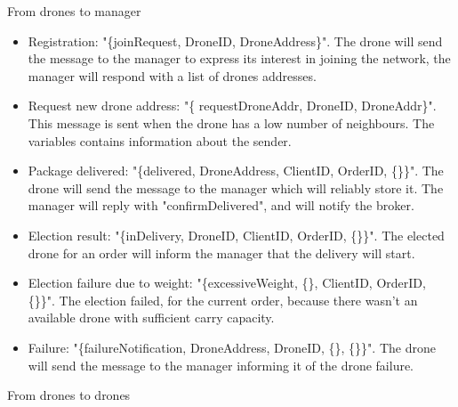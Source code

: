 \documentclass[a4paper, oneside]{memoir}
\begin{document}
From drones to manager
\begin{itemize}
	\item Registration: "\{joinRequest, DroneID, DroneAddress\}".
	The drone will send the message to the manager to express its interest in joining the network, the manager will respond with a list of drones addresses.

	\item Request new drone address: "\{ requestDroneAddr, DroneID, DroneAddr\}".
	This message is sent when the drone has a low number of neighbours. The variables contains information about the sender.

	\item Package delivered: "\{delivered, DroneAddress, ClientID, OrderID, \{\}\}".
	The drone will send the message to the manager which will reliably store it. The manager will reply with "confirmDelivered", and will notify the broker.

	\item Election result: "\{inDelivery, DroneID, ClientID, OrderID, \{\}\}".
	The elected drone for an order will inform the manager that the delivery will start.

	\item Election failure due to weight: "\{excessiveWeight, \{\}, ClientID, OrderID, \{\}\}".
	The election failed, for the current order, because there wasn't an available drone with sufficient carry capacity.

	\item Failure: "\{failureNotification, DroneAddress, DroneID, \{\}, \{\}\}".
	The drone will send the message to the manager informing it of the drone failure.
\end{itemize} \vspace{1em}
From drones to drones
\end{document}

